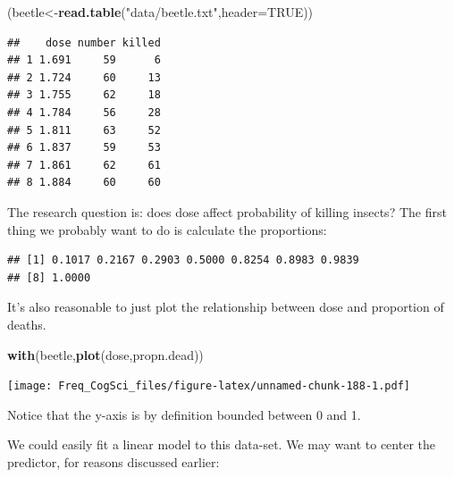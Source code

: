 \documentclass[12pt,]{krantz}
\newenvironment{Shaded}{\begin{snugshade}}{\end{snugshade}}
\newcommand{\DataTypeTok}[1]{\textcolor[rgb]{0.13,0.29,0.53}{#1}}
\newcommand{\KeywordTok}[1]{\textcolor[rgb]{0.13,0.29,0.53}{\textbf{#1}}}
\newcommand{\NormalTok}[1]{#1}
\newcommand{\OperatorTok}[1]{\textcolor[rgb]{0.81,0.36,0.00}{\textbf{#1}}}
\newcommand{\OtherTok}[1]{\textcolor[rgb]{0.56,0.35,0.01}{#1}}
\newcommand{\StringTok}[1]{\textcolor[rgb]{0.31,0.60,0.02}{#1}}
\begin{document}
\begin{Shaded}
\begin{Highlighting}[]
\NormalTok{(beetle<-}\KeywordTok{read.table}\NormalTok{(}\StringTok{"data/beetle.txt"}\NormalTok{,}\DataTypeTok{header=}\OtherTok{TRUE}\NormalTok{))}
\end{Highlighting}
\end{Shaded}

\begin{verbatim}
##    dose number killed
## 1 1.691     59      6
## 2 1.724     60     13
## 3 1.755     62     18
## 4 1.784     56     28
## 5 1.811     63     52
## 6 1.837     59     53
## 7 1.861     62     61
## 8 1.884     60     60
\end{verbatim}

The research question is: does dose affect probability of killing insects? The first thing we probably want to do is calculate the proportions:

\begin{Shaded}
\end{Shaded}

\begin{verbatim}
## [1] 0.1017 0.2167 0.2903 0.5000 0.8254 0.8983 0.9839
## [8] 1.0000
\end{verbatim}

It's also reasonable to just plot the relationship between dose and proportion of deaths.

\begin{Shaded}
\begin{Highlighting}[]
\KeywordTok{with}\NormalTok{(beetle,}\KeywordTok{plot}\NormalTok{(dose,propn.dead))}
\end{Highlighting}
\end{Shaded}

\texttt{[image: Freq\_CogSci\_files/figure-latex/unnamed-chunk-188-1.pdf]}

Notice that the y-axis is by definition bounded between 0 and 1.

We could easily fit a linear model to this data-set. We may want to center the predictor, for reasons discussed earlier:

\begin{Shaded}
\end{Shaded}
\end{document}
